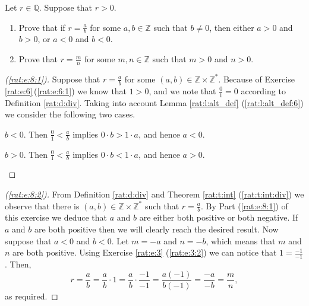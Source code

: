 \Newpage
\begin{exercise} %
	\label{rat:e:8}
	Let $r \in \mathbb{Q}$. Suppose that $r > 0$.
	\begin{enumerate}
		\item Prove that if $r = \frac{a}{b}$ for some $a, b \in \mathbb{Z}$ such that $b \neq 0$, then either $a > 0$ and $b > 0$, or $a < 0$ and $b < 0$. \label{rat:e:8:1}
		\item Prove that $r = \frac{m}{n}$ for some $m, n \in \mathbb{Z}$ such that $m > 0$ and $n > 0$. \label{rat:e:8:2}
	\end{enumerate}
\end{exercise}

\begin{proof}[(\ref{rat:e:8:1})]
	Suppose that $r = \frac{a}{b}$ for some $(a, b) \in \mathbb{Z} \times \mathbb{Z}^{*}$. Because of Exercise\,\ref{rat:e:6}\,(\ref{rat:e:6:1}) we know that $1 > 0$, and we note that $\frac{0}{1} = 0$ according to Definition \ref{rat:d:div}. Taking into account Lemma \ref{rat:l:alt_def} (\ref{rat:l:alt_def:6}) we consider the following two cases.
	\begin{bycases}
		\item $b < 0$. Then $\frac{0}{1} < \frac{a}{b}$ implies $0 \cdot b > 1 \cdot a$, and hence $a < 0$.
		\item $b > 0$. Then $\frac{0}{1} < \frac{a}{b}$ implies $0 \cdot b < 1 \cdot a$, and hence $a > 0$.
	\end{bycases}
\end{proof}

\begin{proof}[(\ref{rat:e:8:2})]
	From Definition \ref{rat:d:div} and Theorem \ref{rat:t:int} (\ref{rat:t:int:div}) we observe that there is ${(a, b) \in \mathbb{Z} \times \mathbb{Z}^{*}}$ such that $r = \frac{a}{b}$. By Part (\ref{rat:e:8:1}) of this exercise we deduce that $a$ and $b$ are either both positive or both negative. If $a$ and $b$ are both positive then we will clearly reach the desired result. Now suppose that $a < 0$ and $b < 0$. Let $m = -a$ and $n = -b$, which means that $m$ and $n$ are both positive. Using Exercise \ref{rat:e:3} (\ref{rat:e:3:2}) we can notice that $1 = \frac{-1}{-1}$. Then,
	\[
		r = \frac{a}{b} = \frac{a}{b} \cdot 1 = \frac{a}{b} \cdot \frac{-1}{-1} = \frac{a(-1)}{b(-1)} = \frac{-a}{-b} = \frac{m}{n},
	\]
	as required.
\end{proof}


